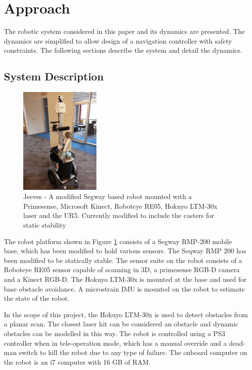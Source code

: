 \documentclass[conference]{IEEEtran}
\begin{document}
\section{Approach}

The robotic system considered in this paper and its dynamics are presented. The dynamics are simplified to allow design of a navigation controller with safety constraints. The following sections describe the system and detail the dynamics.
   
\subsection{System Description}
\begin{figure}
    \centering
    \includegraphics[width = 4cm, scale=0.2]{jeeves2_0.jpg}
    \caption{Jeeves - A modified Segway based robot mounted with a Primesense, Microsoft Kinect, Roboteye RE05, Hokuyo LTM-30x laser and the UR5. Currently modified to include the casters for static stability}
    \label{fig:jeeves}
\end{figure}

The robot platform shown in Figure \ref{fig:jeeves} consists of a Segway RMP-200 mobile base, which has been
modified to hold various sensors. The Seqway RMP 200 has been modified to be statically stable. The sensor suite on the robot consists of a Roboteye RE05 sensor capable of scanning in 3D, a primesense RGB-D camera and a Kinect RGB-D. The Hokuyo LTM-30x is mounted at the base and used for base obstacle avoidance. A microstrain IMU is mounted on the robot to estimate the state of the robot.

In the scope of this project, the Hokuyo LTM-30x is used to detect obstacles from a planar scan. The closest laser hit can be considered an obstacle and dynamic obstacles can be modelled in this way. The robot is controlled using a PS3 controller when in tele-operation mode, which has a manual override and a dead-man switch to kill the robot due to any type of failure. The onboard computer on the robot is an i7 computer with 16 GB of RAM.
\end{document}
